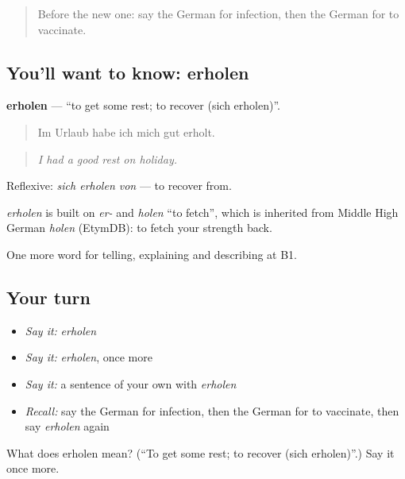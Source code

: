 \begin{quote}
Before the new one: say the German for infection, then the German for to vaccinate.
\end{quote}

\subsection*{You'll want to know: erholen}
\textbf{erholen} — \textquotedblleft{}to get some rest; to recover (sich erholen)\textquotedblright{}.

\begin{quote}
Im Urlaub habe ich mich gut erholt.
\end{quote}

\begin{quote}
\emph{I had a good rest on holiday.}
\end{quote}

Reflexive: \emph{sich erholen von} — to recover from.

\begin{cousinweb}
\emph{erholen} is built on \emph{er-} and \emph{holen} \textquotedblleft{}to fetch\textquotedblright{}, which is inherited from Middle High German \emph{holen} (EtymDB): to fetch your strength back.
\end{cousinweb}

\begin{grammarlens}[title={What you've built}]
One more word for telling, explaining and describing at B1.
\end{grammarlens}

\subsection*{Your turn}
\begin{itemize}
\raggedright
  \item \emph{Say it:} \emph{erholen}
  \item \emph{Say it:} \emph{erholen}, once more
  \item \emph{Say it:} a sentence of your own with \emph{erholen}
  \item \emph{Recall:} say the German for infection, then the German for to vaccinate, then say \emph{erholen} again
\end{itemize}

\begin{tcolorbox}[breakable,colback=teal!4,colframe=teal!35!black,title={Before you move on}]
What does erholen mean? (\textquotedblleft{}To get some rest; to recover (sich erholen)\textquotedblright{}.) Say it once more.
\end{tcolorbox}
